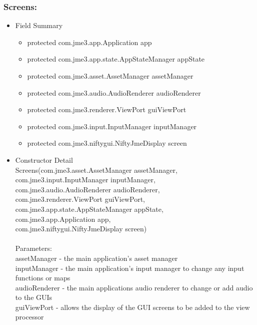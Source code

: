 \documentclass[letterpaper]{article}
\begin{document}
				\subsubsection*{Screens:}
				\vspace{0.1in}	
					\begin{itemize}
						\item	Field Summary
								\begin{itemize}
									\item	protected com.jme3.app.Application	app 
									\item	protected com.jme3.app.state.AppStateManager	appState 
									\item	protected com.jme3.asset.AssetManager	assetManager 
									\item	protected com.jme3.audio.AudioRenderer	audioRenderer 
									\item	protected com.jme3.renderer.ViewPort	guiViewPort 
									\item	protected com.jme3.input.InputManager	inputManager 
									\item	protected com.jme3.niftygui.NiftyJmeDisplay	screen
								\end{itemize}
						\item	Constructor Detail \\
								Screens(com.jme3.asset.AssetManager assetManager, \\
      com.jme3.input.InputManager inputManager, \\
      com.jme3.audio.AudioRenderer audioRenderer, \\
      com.jme3.renderer.ViewPort guiViewPort, \\
      com.jme3.app.state.AppStateManager appState, \\
      com.jme3.app.Application app, \\
      com.jme3.niftygui.NiftyJmeDisplay screen) \\ \\
								Parameters: \\
								assetManager - the main application's asset manager \\
								inputManager - the main application's input manager to change any input functions or maps \\
								audioRenderer - the main applications audio renderer to change or add audio to the GUIs \\
								guiViewPort - allows the display of the GUI screens to be added to the view processor \\

\end{itemize}
\end{document}
